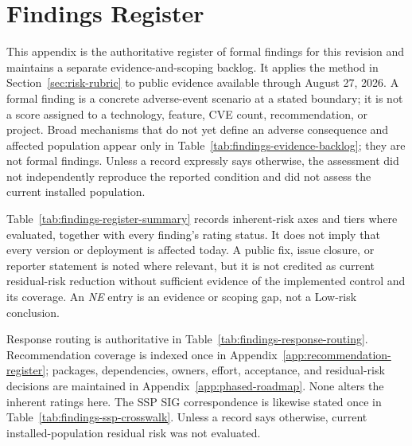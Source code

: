 \documentclass[../main.tex]{subfiles}
\begin{document}
\section{Findings Register}
\label{app:findings-register}

This appendix is the authoritative register of formal findings for this
revision and maintains a separate evidence-and-scoping backlog. It applies the
method in Section~\ref{sec:risk-rubric} to public evidence available through
August 27, 2026. A formal finding is a concrete adverse-event scenario at a
stated boundary; it is not a score assigned to a technology, feature, CVE
count, recommendation, or project. Broad mechanisms that do not yet define an
adverse consequence and affected population appear only in
Table~\ref{tab:findings-evidence-backlog}; they are not formal findings. Unless
a record expressly says otherwise, the assessment did not independently
reproduce the reported condition and did not assess the current installed
population.

Table~\ref{tab:findings-register-summary} records inherent-risk axes and tiers
where evaluated, together with every finding's rating status. It does not imply
that every version or deployment is affected today. A public fix, issue
closure, or reporter statement is noted where relevant, but it is not credited
as current residual-risk reduction without sufficient evidence of the
implemented control and its coverage. An \emph{NE} entry is an evidence or
scoping gap, not a Low-risk conclusion.

Response routing is authoritative in
Table~\ref{tab:findings-response-routing}. Recommendation coverage is indexed
once in Appendix~\ref{app:recommendation-register}; packages, dependencies,
owners, effort, acceptance, and residual-risk decisions are maintained in
Appendix~\ref{app:phased-roadmap}. None alters the inherent ratings here.
The SSP SIG correspondence is likewise stated once in
Table~\ref{tab:findings-ssp-crosswalk}. Unless a record says otherwise,
current installed-population residual risk was not evaluated.
\end{document}
